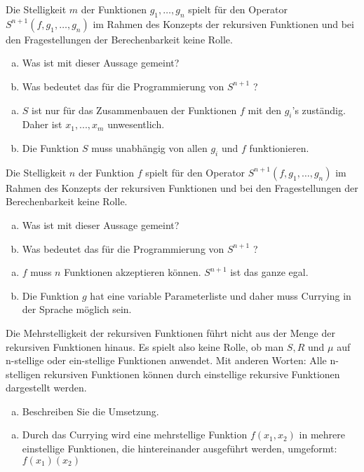 \begin{card}
  Die Stelligkeit $m$ der Funktionen $g_1, \ldots, g_n$ spielt für den Operator $S^{n+1}(f, g_1, \ldots, g_n)$ im Rahmen des Konzepts der rekursiven Funktionen und bei den Fragestellungen der Berechenbarkeit keine Rolle.
  \begin{enumerate}[a)]
    \item Was ist mit dieser Aussage gemeint?
    \item Was bedeutet das für die Programmierung von $S^{n+1}$ ?
  \end{enumerate}
  \hr
  \begin{enumerate}[a)]
    \item $S$ ist nur für das Zusammenbauen der Funktionen $f$ mit den $g_i$'s zuständig. Daher ist $x_1, ..., x_m$
      unwesentlich.
    \item Die Funktion $S$ muss unabhängig von allen $g_i$ und $f$ funktionieren.
  \end{enumerate}
\end{card}

\begin{card}
  Die Stelligkeit $n$ der Funktion $f$ spielt für den Operator $S^{n+1}(f, g_1, \ldots, g_n)$ im Rahmen des Konzepts der rekursiven Funktionen und bei den Fragestellungen der Berechenbarkeit keine Rolle.
  \begin{enumerate}[a)]
    \item Was ist mit dieser Aussage gemeint?
    \item Was bedeutet das für die Programmierung von $S^{n+1}$ ?
  \end{enumerate}
  \hr
  \begin{enumerate}[a)]
    \item $f$ muss $n$ Funktionen akzeptieren können. $S^{n+1}$ ist das ganze egal.
    \item Die Funktion $g$ hat eine variable Parameterliste und daher muss Currying in der Sprache möglich sein.
  \end{enumerate}
\end{card}

\begin{card}
  Die Mehrstelligkeit der rekursiven Funktionen führt nicht aus der Menge der rekursiven Funktionen hinaus. Es spielt also keine Rolle, ob man $S, R$ und $\mu$ auf n-stellige oder ein-stellige Funktionen anwendet. Mit anderen Worten: Alle n-stelligen rekursiven Funktionen können durch einstellige rekursive Funktionen dargestellt werden.
  \begin{enumerate}[a)]
    \item Beschreiben Sie die Umsetzung.
  \end{enumerate}
  \hr
  \begin{enumerate}[a)]
    \item Durch das Currying wird eine mehrstellige Funktion $f(x_1, x_2)$ in mehrere einstellige Funktionen, die
      hintereinander ausgeführt werden, umgeformt: $f(x_1)(x_2)$
  \end{enumerate}
\end{card}

